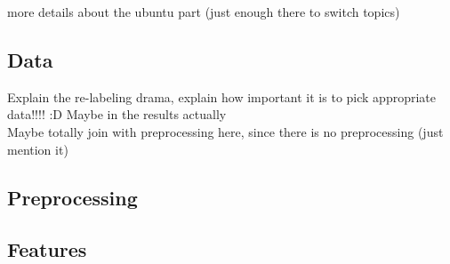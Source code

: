 \documentclass[
paper=128mm:96mm, %
fontsize=11pt, %
pagesize, %
parskip=half-, %
]{scrartcl} %
\theoremstyle{mythmstyle} %
\begin{document}
more details about the ubuntu part (just enough there to switch topics)

\clearpage


\subsection*{Data}



Explain the re-labeling drama, explain how important it is to pick appropriate data!!!! :D Maybe in the results actually \\
Maybe totally join with preprocessing here, since there is no preprocessing (just mention it)

\begin{comment}
\begin{table}[h]
\centering
\begin{tabular}{l l l}
\toprule
\textbf{Treatments} & \textbf{Response 1} & \textbf{Response 2}\\
\midrule
Treatment 1 & 0.0003262 & 0.562 \\
Treatment 2 & 0.0015681 & 0.910 \\
Treatment 3 & 0.0009271 & 0.296 \\
\bottomrule
\end{tabular}
\caption{Table caption}
\end{table}
\end{comment}

\clearpage


\subsection*{Preprocessing}

\begin{comment}
\begin{figure}[h]
\end{figure}
\end{comment}


\clearpage


\subsection*{Features}
\end{document}
